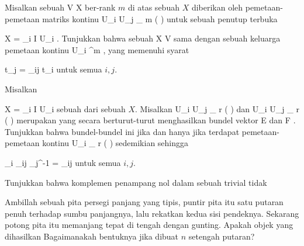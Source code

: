{}
{

Misalkan sebuah
\maabb {} { V } { X
} {}
ber-rank $m$ di atas sebuah
$X$ diberikan oleh pemetaan-pemetaan matriks kontinu
 { U_i \cap U_j } { _{  m   } \! \left(  \R  \right)
} {}
untuk sebuah penutup terbuka

\mavergleichskette
{\vergleichskette
{X
}
{ = }{ \bigcup_{i \in I} U_i
}
{  }{
}
{    }{
}
{   }{
}
}
{}{}{}.
Tunjukkan bahwa sebuah
 { X } { V
} {}
sama dengan sebuah keluarga pemetaan kontinu
 {U_i } { \R^m
} {,}
yang memenuhi syarat

\mavergleichskettedisp
{\vergleichskette
{t_j
}
{ =} { \varphi_{ij} t_i
}
{ } {
}
{ } {
}
{ } {
}
}
{}{}{}
untuk semua $i,j$.

}
{} {}

{}
{

Misalkan

\mavergleichskette
{\vergleichskette
{X
}
{ = }{ \bigcup_{i \in I} U_i
}
{  }{
}
{    }{
}
{   }{
}
}
{}{}{}
sebuah
dari sebuah
$X$. Misalkan
 {U_i \cap U_j } { _{  r   } \! \left(  \R  \right)
} {}
dan
 {U_i \cap U_j } { _{  r   } \! \left(  \R  \right)
} {}
merupakan
yang secara berturut-turut menghasilkan bundel vektor
\mathkor {} {E} {dan} {F} {.}
Tunjukkan bahwa bundel-bundel ini
jika dan hanya jika terdapat pemetaan-pemetaan kontinu
 { U_i } { _{  r   } \! \left(  \R  \right)
} {}
sedemikian sehingga
 {} {}

\mavergleichskettedisp
{\vergleichskette
{ \alpha_i \circ  \varphi_{ij}  \circ \alpha_j^{-1}
}
{ =} { \psi_{ij}
}
{ } {
}
{ } {
}
{ } {
}
}
{}{}{}
untuk semua $i,j$.

}
{} {}

{}
{

Tunjukkan bahwa komplemen penampang nol dalam sebuah
trivial tidak

}
{} {}

{}
{

Ambillah sebuah pita persegi panjang yang tipis, puntir pita itu satu putaran penuh terhadap sumbu panjangnya, lalu rekatkan kedua sisi pendeknya. Sekarang potong pita itu memanjang tepat di tengah dengan gunting. Apakah objek yang dihasilkan
Bagaimanakah bentuknya jika dibuat $n$ setengah putaran?

}
{} {}

